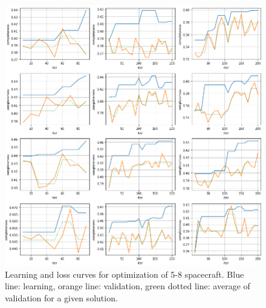 \begin{figure}[p]
 \centering
 \includegraphics[width=1.0\textwidth]{img/appendix_loss_2.png}
 \caption{Learning and loss curves for optimization of 5-8 spacecraft. Blue line: learning, orange line: validation, green dotted line: average of validation for a given solution.}
\end{figure}



